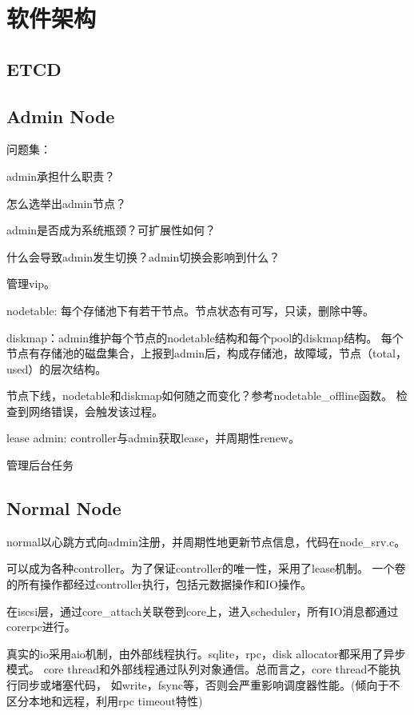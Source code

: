 \chapter{软件架构}

\section{ETCD}

\section{Admin Node}

问题集：
\begin{compactenum}
\item admin承担什么职责？
\item 怎么选举出admin节点？
\item admin是否成为系统瓶颈？可扩展性如何？
\item 什么会导致admin发生切换？admin切换会影响到什么？
\end{compactenum}

管理vip。

nodetable: 每个存储池下有若干节点。节点状态有可写，只读，删除中等。

diskmap：admin维护每个节点的nodetable结构和每个pool的diskmap结构。
每个节点有存储池的磁盘集合，上报到admin后，构成存储池，故障域，节点（total，used）的层次结构。

节点下线，nodetable和diskmap如何随之而变化？参考nodetable\_offline函数。
检查到网络错误，会触发该过程。

lease admin: controller与admin获取lease，并周期性renew。

管理后台任务

\section{Normal Node}

normal以心跳方式向admin注册，并周期性地更新节点信息，代码在node\_srv.c。

可以成为各种controller。为了保证controller的唯一性，采用了lease机制。
一个卷的所有操作都经过controller执行，包括元数据操作和IO操作。

在iscsi层，通过core\_attach关联卷到core上，进入scheduler，所有IO消息都通过corerpc进行。

真实的io采用aio机制，由外部线程执行。sqlite，rpc，disk allocator都采用了异步模式。
core thread和外部线程通过队列对象通信。总而言之，core thread不能执行同步或堵塞代码，
如write，fsync等，否则会严重影响调度器性能。(倾向于不区分本地和远程，利用rpc timeout特性)

